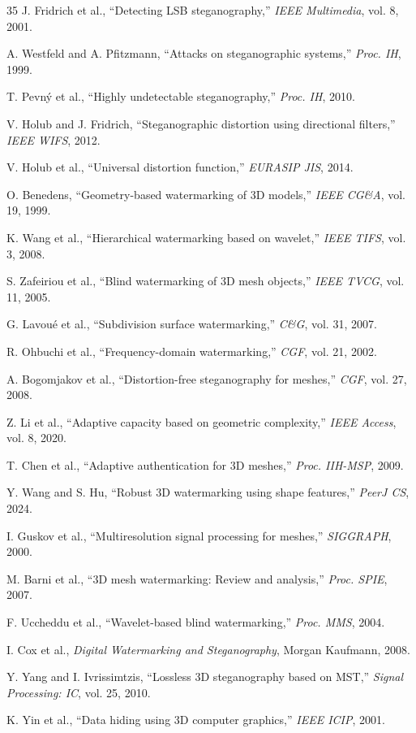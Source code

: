 \documentclass[conference]{IEEEtran}
\begin{document}
\begin{thebibliography}{35}
J. Fridrich et al., ``Detecting LSB steganography,'' \textit{IEEE Multimedia}, vol. 8, 2001.

A. Westfeld and A. Pfitzmann, ``Attacks on steganographic systems,'' \textit{Proc. IH}, 1999.

T. Pevný et al., ``Highly undetectable steganography,'' \textit{Proc. IH}, 2010.

V. Holub and J. Fridrich, ``Steganographic distortion using directional filters,'' \textit{IEEE WIFS}, 2012.

V. Holub et al., ``Universal distortion function,'' \textit{EURASIP JIS}, 2014.

O. Benedens, ``Geometry-based watermarking of 3D models,'' \textit{IEEE CG\&A}, vol. 19, 1999.

K. Wang et al., ``Hierarchical watermarking based on wavelet,'' \textit{IEEE TIFS}, vol. 3, 2008.

S. Zafeiriou et al., ``Blind watermarking of 3D mesh objects,'' \textit{IEEE TVCG}, vol. 11, 2005.

G. Lavoué et al., ``Subdivision surface watermarking,'' \textit{C\&G}, vol. 31, 2007.

R. Ohbuchi et al., ``Frequency-domain watermarking,'' \textit{CGF}, vol. 21, 2002.

A. Bogomjakov et al., ``Distortion-free steganography for meshes,'' \textit{CGF}, vol. 27, 2008.

Z. Li et al., ``Adaptive capacity based on geometric complexity,'' \textit{IEEE Access}, vol. 8, 2020.

T. Chen et al., ``Adaptive authentication for 3D meshes,'' \textit{Proc. IIH-MSP}, 2009.

Y. Wang and S. Hu, ``Robust 3D watermarking using shape features,'' \textit{PeerJ CS}, 2024.

I. Guskov et al., ``Multiresolution signal processing for meshes,'' \textit{SIGGRAPH}, 2000.

M. Barni et al., ``3D mesh watermarking: Review and analysis,'' \textit{Proc. SPIE}, 2007.

F. Uccheddu et al., ``Wavelet-based blind watermarking,'' \textit{Proc. MMS}, 2004.

I. Cox et al., \textit{Digital Watermarking and Steganography}, Morgan Kaufmann, 2008.

Y. Yang and I. Ivrissimtzis, ``Lossless 3D steganography based on MST,'' \textit{Signal Processing: IC}, vol. 25, 2010.

K. Yin et al., ``Data hiding using 3D computer graphics,'' \textit{IEEE ICIP}, 2001.

\end{thebibliography}
\end{document}
